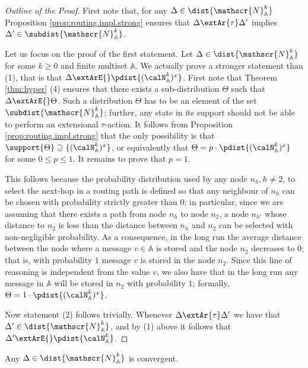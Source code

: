 \documentclass{LMCS}
\begin{document}
\begin{proof}[Outline of the Proof]
First note that, for any $\Delta \in \dist{\mathscr{N}^k_{\mathbb{A}}}$ 
Proposition \ref{prop:routing.impl.strong} 
ensures that $\Delta \extAr{\tau} \Delta'$ 
implies $\Delta' \in \subdist{\mathscr{N}^k_{\mathbb{A}}}$. 

Let us focus on the proof of the first statement.
Let $\Delta \in \dist{\mathscr{N}^k_{\mathbb{A}}}$ 
for some $k \geq 0$ and finite multiset $\mathbb{A}$. 
We actually prove a stronger statement than (1), 
that is that $\Delta \extArE{} \pdist{(\calN^k_{\mathbb{A}})^{x}}$. 
First note that Theorem \ref{thm:hyper} (4) 
ensures that there exists a sub-distribution 
$\Theta$ such that $\Delta \extArE{} \Theta$. 
Such a distribution $\Theta$ has to be an element 
of the set $\subdist{\mathscr{N}^k_{\mathbb{A}}}$; 
further, any state in its support should not be 
able to perform an extensional $\tau$-action. 
It follows from Proposition \ref{prop:routing.impl.strong} 
that the only possibility is that $\support{\Theta} \supseteq 
\{(\calN^k_{\mathbb{A}})^{x}\}$, or equivalently that 
$\Theta = p \cdot \pdist{(\calN^k_{\mathbb{A}})^{x}}$ 
for some $0 \leq p \leq 1$. It remains to prove that 
$p = 1$.

This follows because the probability distribution used 
by any node $n_h, h \neq 2$, to select the next-hop in a 
routing path is defined so that any neighbour of 
$n_h$ can be chosen with probability strictly greater 
than $0$; in particular, since we are 
assuming that there exists a path from node $n_h$ to node $n_2$, 
a node $n_{h'}$ whose distance to $n_2$ is less than the 
distance between $n_h$ and $n_2$ can be selected with 
non-negligible probability. As a consequence, in 
the long run the average distance between the node 
where a message $v \in \mathbb{A}$ is stored and 
the node $n_2$ decreases to $0$; that is, 
with probability $1$ message $v$ is stored in 
the node $n_2$. 
Since this line of reasoning is independent from 
the value $v$, we also have that in the long run 
any message in $\mathbb{A}$ 
will be stored in $n_2$ with probability $1$; 
formally, $\Theta = 1 \cdot \pdist{(\calN^{k}_{\mathbb{A}})^{x}}$.

Now statement (2) follows trivially. Whenever $\Delta \extAr{\tau} \Delta'$ 
we have that $\Delta' \in \dist{\mathscr{N}^k_{\mathbb{A}}}$, and 
by (1) above it follows that $\Delta' \extArE{} \pdist{\calN^{k}_{\mathbb{A}}}$. 
\end{proof}

\begin{cor}
\label{cor:impl.convergent}
Any $\Delta \in \dist{\mathscr{N}^k_{\mathbb{A}}}$ is 
convergent.
\end{cor}
\end{document}
